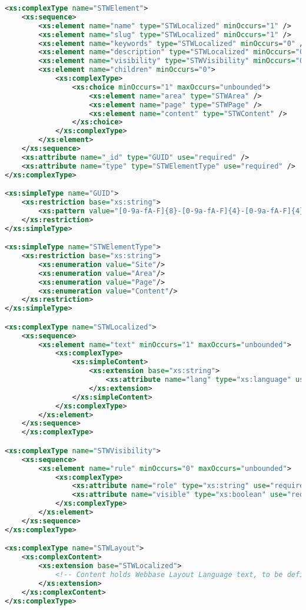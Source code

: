 \begin{lstlisting}[language=XML,caption={STWElement Base Type Definition}]
<xs:complexType name="STWElement">
	<xs:sequence>
		<xs:element name="name" type="STWLocalized" minOccurs="1" />
		<xs:element name="slug" type="STWLocalized" minOccurs="1" />
		<xs:element name="keywords" type="STWLocalized" minOccurs="0" />
		<xs:element name="description" type="STWLocalized" minOccurs="0" />
		<xs:element name="visibility" type="STWVisibility" minOccurs="0" />
		<xs:element name="children" minOccurs="0">
			<xs:complexType>
				<xs:choice minOccurs="1" maxOccurs="unbounded">
					<xs:element name="area" type="STWArea" />
					<xs:element name="page" type="STWPage" />
					<xs:element name="content" type="STWContent" />
				</xs:choice>
			</xs:complexType>
		</xs:element>
	</xs:sequence>
	<xs:attribute name="_id" type="GUID" use="required" />
	<xs:attribute name="type" type="STWElementType" use="required" />
</xs:complexType>

<xs:simpleType name="GUID">
	<xs:restriction base="xs:string">
		<xs:pattern value="[0-9a-fA-F]{8}-[0-9a-fA-F]{4}-[0-9a-fA-F]{4}-[0-9a-fA-F]{4}-[0-9a-fA-F]{12}" />
	</xs:restriction>
</xs:simpleType>

<xs:simpleType name="STWElementType">
	<xs:restriction base="xs:string">
		<xs:enumeration value="Site"/>
		<xs:enumeration value="Area"/>
		<xs:enumeration value="Page"/>
		<xs:enumeration value="Content"/>
	</xs:restriction>
</xs:simpleType>

<xs:complexType name="STWLocalized">
	<xs:sequence>
		<xs:element name="text" minOccurs="1" maxOccurs="unbounded">
			<xs:complexType>
				<xs:simpleContent>
					<xs:extension base="xs:string">
						<xs:attribute name="lang" type="xs:language" use="required"/>
					</xs:extension>
				</xs:simpleContent>
			</xs:complexType>
		</xs:element>
	</xs:sequence>
	</xs:complexType>

<xs:complexType name="STWVisibility">
	<xs:sequence>
		<xs:element name="rule" minOccurs="0" maxOccurs="unbounded">
			<xs:complexType>
				<xs:attribute name="role" type="xs:string" use="required"/>
				<xs:attribute name="visible" type="xs:boolean" use="required"/>
			</xs:complexType>
		</xs:element>
	</xs:sequence>
</xs:complexType>

<xs:complexType name="STWLayout">
	<xs:complexContent>
		<xs:extension base="STWLocalized">
			<!-- Content holds Webbase Layout Language text, to be defined later. -->
		</xs:extension>
	</xs:complexContent>
</xs:complexType>
\end{lstlisting}

